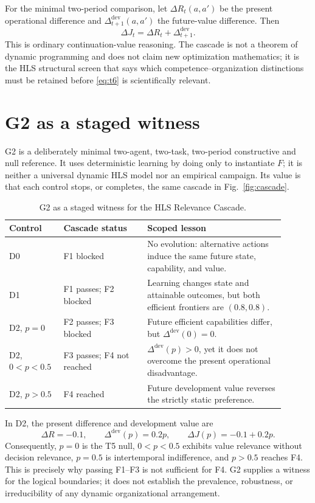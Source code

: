 \documentclass[10pt]{article}
\begin{document}
For the minimal two-period comparison, let $\Delta R_t(a,a')$ be the present
operational difference and $\Delta^{\mathrm{dev}}_{t+1}(a,a')$ the future-value
difference. Then
\begin{equation}
\Delta J_t=\Delta R_t+\Delta^{\mathrm{dev}}_{t+1}.
\label{eq:t6}
\end{equation}
This is ordinary continuation-value reasoning. The cascade is not a theorem
of dynamic programming and does not claim new optimization mathematics; it is
the HLS structural screen that says which competence--organization distinctions
must be retained before \eqref{eq:t6} is scientifically relevant.

\section{G2 as a staged witness}

G2 is a deliberately minimal two-agent, two-task, two-period constructive and
null reference. It uses deterministic learning by doing only to instantiate
$F$; it is neither a universal dynamic HLS model nor an empirical campaign.
Its value is that each control stops, or completes, the same cascade in
Fig.~\ref{fig:cascade}.

\begin{table}[t]
\centering
\small
\begin{tabular}{p{0.16\linewidth}p{0.28\linewidth}p{0.46\linewidth}}
\toprule
Control & Cascade status & Scoped lesson \\
\midrule
D0 & F1 blocked & No evolution: alternative actions induce the same future
state, capability, and value. \\
D1 & F1 passes; F2 blocked & Learning changes state and attainable outcomes,
but both efficient frontiers are $(0.8,0.8)$. \\
D2, $p=0$ & F2 passes; F3 blocked & Future efficient capabilities differ, but
$\Delta^{\mathrm{dev}}(0)=0$. \\
D2, $0<p<0.5$ & F3 passes; F4 not reached &
$\Delta^{\mathrm{dev}}(p)>0$, yet it does not overcome the present
operational disadvantage. \\
D2, $p>0.5$ & F4 reached & Future development value reverses the strictly
static preference. \\
\bottomrule
\end{tabular}
\caption{G2 as a staged witness for the HLS Relevance Cascade.}
\label{tab:g2}
\end{table}

In D2, the present difference and development value are
\begin{equation}
\Delta R=-0.1,\qquad
\Delta^{\mathrm{dev}}(p)=0.2p,\qquad
\Delta J(p)=-0.1+0.2p.
\label{eq:d2}
\end{equation}
Consequently, $p=0$ is the T5 null, $0<p<0.5$ exhibits value relevance without
decision relevance, $p=0.5$ is intertemporal indifference, and $p>0.5$
reaches F4. This is precisely why passing F1--F3 is not sufficient for F4.
G2 supplies a witness for the logical boundaries; it does not establish the
prevalence, robustness, or irreducibility of any dynamic organizational
arrangement.
\end{document}
